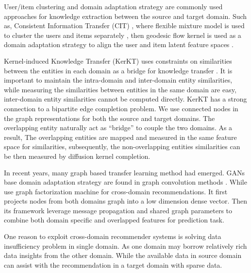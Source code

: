 User/item clustering and domain adaptation strategy are commonly used approaches for knowledge extraction between the source and target domain. Such as, Consistent Information Transfer (CIT) \citep{zhang2017cross}, where flexible mixture model is used to cluster the users and items separately \citep{si2003flexible}, then geodesic flow kernel is used as a domain adaptation strategy to align the user and item latent feature spaces \citep{gong2014learning}.

Kernel-induced Knowledge Transfer (KerKT) uses constraints on similarities between the entities in each domain as a bridge for knowledge transfer \citep{zhang2018cross}. It is important to maintain the intra-domain and inter-domain entity similarities, while measuring the similarities between entities in the same domain are easy, inter-domain entity similarities cannot be computed directly.
KerKT has a strong connection to a bipartite edge completion problem\citep{he2016birank}. We use connected nodes in the graph representations for both the source and target domains. The overlapping entity naturally act as ``bridge'' to couple the two domains.
As a result, The overlapping entities are mapped and measured in the same feature space for similarities, subsequently, the non-overlapping entities similarities can be then measured by diffusion kernel completion.

In recent years, many graph based transfer learning method had emerged. GANs \citep{goodfellow2014generative} base domain adaptation strategy are found in graph convolution methods \citep{dai2019network}. While \citet{xi2020graph} use graph factorization machine for cross-domain recommendations. It first projects nodes from both domains graph into a low dimension dense vector. Then its framework leverage message propagation and shared graph parameters to combine both domain specific and overlapped features for prediction task.

One reason to exploit cross-domain recommender systems is solving data insufficiency problem in single domain. As one domain may borrow relatively rich data insights from the other domain. While the available data in source domain can assist with the recommendation in a target domain with sparse data. 


